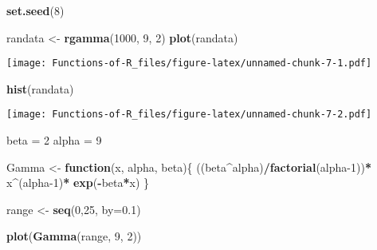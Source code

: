 \documentclass[
]{article}
\newenvironment{Shaded}{\begin{snugshade}}{\end{snugshade}}
\newcommand{\AttributeTok}[1]{\textcolor[rgb]{0.13,0.29,0.53}{#1}}
\newcommand{\ControlFlowTok}[1]{\textcolor[rgb]{0.13,0.29,0.53}{\textbf{#1}}}
\newcommand{\DecValTok}[1]{\textcolor[rgb]{0.00,0.00,0.81}{#1}}
\newcommand{\FloatTok}[1]{\textcolor[rgb]{0.00,0.00,0.81}{#1}}
\newcommand{\FunctionTok}[1]{\textcolor[rgb]{0.13,0.29,0.53}{\textbf{#1}}}
\newcommand{\NormalTok}[1]{#1}
\newcommand{\OtherTok}[1]{\textcolor[rgb]{0.56,0.35,0.01}{#1}}
\newcommand{\SpecialCharTok}[1]{\textcolor[rgb]{0.81,0.36,0.00}{\textbf{#1}}}
\begin{document}
\begin{Shaded}
\begin{Highlighting}[]
\FunctionTok{set.seed}\NormalTok{(}\DecValTok{8}\NormalTok{)}

\NormalTok{randata }\OtherTok{\textless{}{-}} \FunctionTok{rgamma}\NormalTok{(}\DecValTok{1000}\NormalTok{, }\DecValTok{9}\NormalTok{, }\DecValTok{2}\NormalTok{)}
\FunctionTok{plot}\NormalTok{(randata)}
\end{Highlighting}
\end{Shaded}

\texttt{[image: Functions-of-R\_files/figure-latex/unnamed-chunk-7-1.pdf]}

\begin{Shaded}
\begin{Highlighting}[]
\FunctionTok{hist}\NormalTok{(randata)}
\end{Highlighting}
\end{Shaded}

\texttt{[image: Functions-of-R\_files/figure-latex/unnamed-chunk-7-2.pdf]}

\begin{Shaded}
\begin{Highlighting}[]
\NormalTok{beta }\OtherTok{=} \DecValTok{2}
\NormalTok{alpha }\OtherTok{=} \DecValTok{9}
\end{Highlighting}
\end{Shaded}

\begin{Shaded}
\begin{Highlighting}[]
\NormalTok{Gamma }\OtherTok{\textless{}{-}} \ControlFlowTok{function}\NormalTok{(x, alpha, beta)\{}
\NormalTok{  ((beta}\SpecialCharTok{\^{}}\NormalTok{alpha)}\SpecialCharTok{/}\FunctionTok{factorial}\NormalTok{(alpha}\DecValTok{{-}1}\NormalTok{))}\SpecialCharTok{*}\NormalTok{ x}\SpecialCharTok{\^{}}\NormalTok{(alpha}\DecValTok{{-}1}\NormalTok{)}\SpecialCharTok{*} \FunctionTok{exp}\NormalTok{(}\SpecialCharTok{{-}}\NormalTok{beta}\SpecialCharTok{*}\NormalTok{x)}
\NormalTok{\}}

\NormalTok{range }\OtherTok{\textless{}{-}} \FunctionTok{seq}\NormalTok{(}\DecValTok{0}\NormalTok{,}\DecValTok{25}\NormalTok{, }\AttributeTok{by=}\FloatTok{0.1}\NormalTok{)}


\FunctionTok{plot}\NormalTok{(}\FunctionTok{Gamma}\NormalTok{(range, }\DecValTok{9}\NormalTok{, }\DecValTok{2}\NormalTok{))}
\end{Highlighting}
\end{Shaded}
\end{document}
